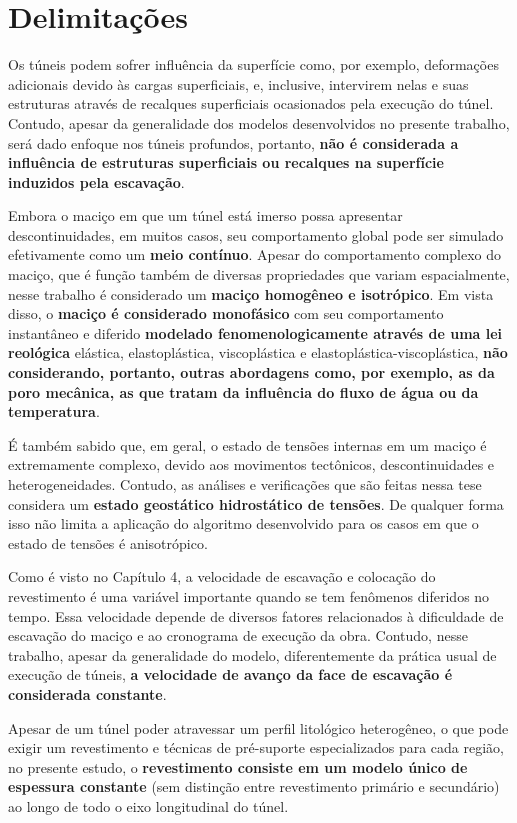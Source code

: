 \section{Delimitações}
Os túneis podem sofrer influência da superfície como, por exemplo, deformações adicionais devido às cargas superficiais, e, inclusive, intervirem nelas e suas estruturas através de recalques superficiais ocasionados pela execução do túnel. Contudo, apesar da generalidade dos modelos desenvolvidos no presente trabalho, será dado enfoque nos túneis profundos, portanto, \textbf{não é considerada a influência de estruturas superficiais ou recalques na superfície induzidos pela escavação}.

Embora o maciço em que um túnel está imerso possa apresentar descontinuidades, em muitos casos, seu comportamento global pode ser simulado efetivamente como um \textbf{meio contínuo}. Apesar do comportamento complexo do maciço, que é função também de diversas propriedades que variam espacialmente, nesse trabalho é considerado um \textbf{maciço homogêneo e isotrópico}. Em vista disso, o \textbf{maciço é considerado monofásico} com seu comportamento instantâneo e diferido \textbf{modelado fenomenologicamente através de uma lei reológica} elástica, elastoplástica, viscoplástica e elastoplástica-viscoplástica, \textbf{não considerando, portanto, outras abordagens como, por exemplo, as da poro mecânica, as que tratam da influência do fluxo de água ou da temperatura}.

É também sabido que, em geral, o estado de tensões internas em um maciço é extremamente complexo, devido aos movimentos tectônicos, descontinuidades e heterogeneidades. Contudo, as análises e verificações que são feitas nessa tese considera um \textbf{estado geostático hidrostático de tensões}. De qualquer forma isso não limita a aplicação do algoritmo desenvolvido para os casos em que o estado de tensões é anisotrópico.

Como é visto no Capítulo 4, a velocidade de escavação e colocação do revestimento é uma variável importante quando se tem fenômenos diferidos no tempo. Essa velocidade depende de diversos fatores relacionados à dificuldade de escavação do maciço e ao cronograma de execução da obra. Contudo, nesse trabalho, apesar da generalidade do modelo, diferentemente da prática usual de execução de túneis, \textbf{a velocidade de avanço da face de escavação é considerada constante}.

Apesar de um túnel poder atravessar um perfil litológico heterogêneo, o que pode exigir um revestimento e técnicas de pré-suporte especializados para cada região, no presente estudo, o \textbf{revestimento consiste em um modelo único de espessura constante} (sem distinção entre revestimento primário e secundário) ao longo de todo o eixo longitudinal do túnel.

